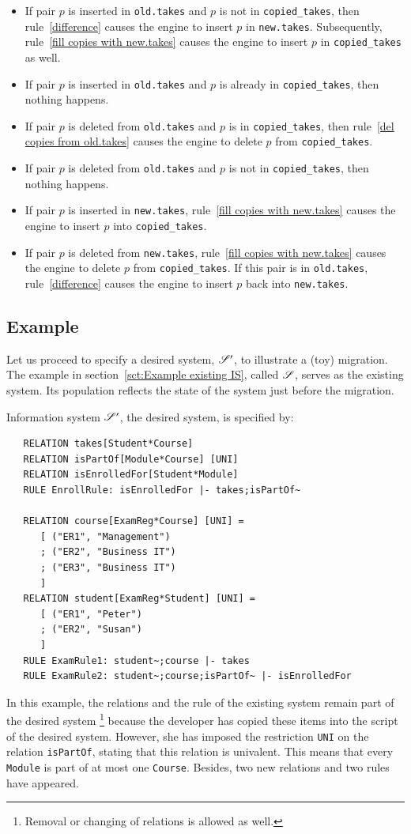 \documentclass{elsarticle}
\begin{document}
\begin{itemize}
\item If pair $p$ is inserted in {\tt old.takes} and $p$ is not in {\tt copied\_takes},
      then rule~\ref{difference} causes the engine to insert $p$ in {\tt new.takes}.
      Subsequently, rule~\ref{fill copies with new.takes} causes the engine to insert $p$ in {\tt copied\_takes} as well.
\item If pair $p$ is inserted in {\tt old.takes} and $p$ is already in {\tt copied\_takes},
      then nothing happens.
\item If pair $p$ is deleted from {\tt old.takes} and $p$ is in {\tt copied\_takes},
      then rule~\ref{del copies from old.takes} causes the engine to delete $p$ from {\tt copied\_takes}.
\item If pair $p$ is deleted from {\tt old.takes} and $p$ is not in {\tt copied\_takes},
      then nothing happens.
\item If pair $p$ is inserted in {\tt new.takes},
      rule~\ref{fill copies with new.takes} causes the engine to insert $p$ into {\tt copied\_takes}.
\item If pair $p$ is deleted from {\tt new.takes},
      rule~\ref{fill copies with new.takes} causes the engine to delete $p$ from {\tt copied\_takes}.
      If this pair is in {\tt old.takes}, rule~\ref{difference} causes the engine to insert $p$ back into {\tt new.takes}.
\end{itemize}

\subsection{Example}
   Let us proceed to specify a desired system, $\mathscr{S}'$, to illustrate a (toy) migration.
   The example in section~\ref{sct:Example existing IS}, called $\mathscr{S}$, serves as the existing system.
   Its population reflects the state of the system just before the migration.

   Information system $\mathscr{S}'$, the desired system, is specified by:
\begin{verbatim}
   RELATION takes[Student*Course]
   RELATION isPartOf[Module*Course] [UNI]
   RELATION isEnrolledFor[Student*Module]
   RULE EnrollRule: isEnrolledFor |- takes;isPartOf~
   
   RELATION course[ExamReg*Course] [UNI] =
      [ ("ER1", "Management")
      ; ("ER2", "Business IT")
      ; ("ER3", "Business IT")
      ]
   RELATION student[ExamReg*Student] [UNI] =
      [ ("ER1", "Peter")
      ; ("ER2", "Susan")
      ]
   RULE ExamRule1: student~;course |- takes
   RULE ExamRule2: student~;course;isPartOf~ |- isEnrolledFor
\end{verbatim}
   In this example, the relations and the rule of the existing system remain part of the desired system%
\footnote{Removal or changing of relations is allowed as well.}
   because the developer has copied these items into the script of the desired system.
   However, she has imposed the restriction \verb-UNI- on the relation {\tt isPartOf}, stating that this relation is univalent.
   This means that every \verb-Module- is part of at most one \verb-Course-.
   Besides, two new relations and two rules have appeared.
\end{document}

